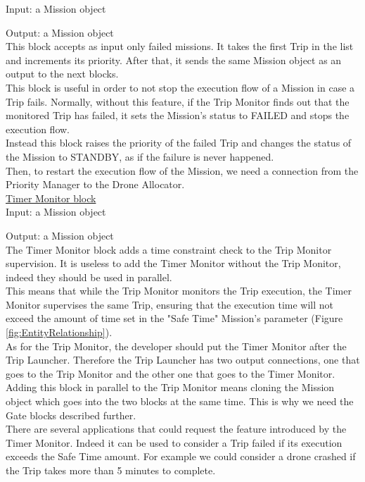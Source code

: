 Input: a Mission object

Output: a Mission object
\\

This block accepts as input only failed missions.
It takes the first Trip in the list and increments its priority.
After that, it sends the same Mission object as an output to the next blocks.
\\
This block is useful in order to not stop the execution flow of a Mission in case a Trip fails.
Normally, without this feature, if the Trip Monitor finds out that the monitored Trip has failed, it sets the Mission's status to FAILED and stops the execution flow.
\\
Instead this block raises the priority of the failed Trip and changes the status of the Mission to STANDBY, as if the failure is never happened.
\\
Then, to restart the execution flow of the Mission, we need a connection from the Priority Manager to the Drone Allocator.
\\

\underline{Timer Monitor block}
\\

Input: a Mission object

Output: a Mission object
\\

The Timer Monitor block adds a time constraint check to the Trip Monitor supervision. 
It is useless to add the Timer Monitor without the Trip Monitor, indeed they should be used in parallel.
\\
This means that while the Trip Monitor monitors the Trip execution, the Timer Monitor supervises the same Trip, ensuring that the execution time will not exceed the amount of time set in the "Safe Time" Mission's parameter (Figure \ref{fig:EntityRelationship}).
\\
As for the Trip Monitor, the developer should put the Timer Monitor after the Trip Launcher.
Therefore the Trip Launcher has two output connections, one that goes to the Trip Monitor and the other one that goes to the Timer Monitor.
\\
Adding this block in parallel to the Trip Monitor means cloning the Mission object which goes into the two blocks at the same time.
This is why we need the Gate blocks described further.
\\
There are several applications that could request the feature introduced by the Timer Monitor. 
Indeed it can be used to consider a Trip failed if its execution exceeds the Safe Time amount.
For example we could consider a drone crashed if the Trip takes more than 5 minutes to complete.
\\

